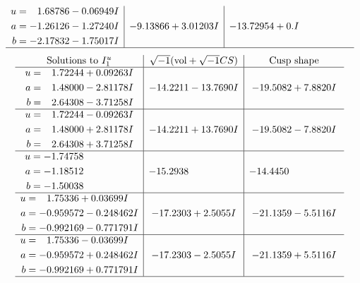 \documentclass[1p]{elsarticle_modified}
\theoremstyle{definition}
\newcommand{\I}{\sqrt{-1}}
\begin{document}
$$\begin{array}{c|c|c}
\begin{aligned}
u &= \phantom{-}1.68786 - 0.06949 I \\
a &= -1.26126 - 1.27240 I \\
b &= -2.17832 - 1.75017 I\end{aligned}
 & -9.13866 + 3.01203 I & -13.72954 + 0. I\phantom{ +0.000000I}\\
 \hline 
 \end{array}$$\newpage$$\begin{array}{c|c|c}  
\text{Solutions to }I^u_{1}& \I (\text{vol} + \sqrt{-1}CS) & \text{Cusp shape}\\
 \hline 
\begin{aligned}
u &= \phantom{-}1.72244 + 0.09263 I \\
a &= \phantom{-}1.48000 - 2.81178 I \\
b &= \phantom{-}2.64308 - 3.71258 I\end{aligned}
 & -14.2211 - 13.7690 I & -19.5082 + 7.8820 I \\ \hline\begin{aligned}
u &= \phantom{-}1.72244 - 0.09263 I \\
a &= \phantom{-}1.48000 + 2.81178 I \\
b &= \phantom{-}2.64308 + 3.71258 I\end{aligned}
 & -14.2211 + 13.7690 I & -19.5082 - 7.8820 I \\ \hline\begin{aligned}
u &= -1.74758\phantom{ +0.000000I} \\
a &= -1.18512\phantom{ +0.000000I} \\
b &= -1.50038\phantom{ +0.000000I}\end{aligned}
 & -15.2938\phantom{ +0.000000I} & -14.4450\phantom{ +0.000000I} \\ \hline\begin{aligned}
u &= \phantom{-}1.75336 + 0.03699 I \\
a &= -0.959572 - 0.248462 I \\
b &= -0.992169 - 0.771791 I\end{aligned}
 & -17.2303 + 2.5055 I & -21.1359 - 5.5116 I \\ \hline\begin{aligned}
u &= \phantom{-}1.75336 - 0.03699 I \\
a &= -0.959572 + 0.248462 I \\
b &= -0.992169 + 0.771791 I\end{aligned}
 & -17.2303 - 2.5055 I & -21.1359 + 5.5116 I\\
 \hline 
 \end{array}$$\newpage\newpage\renewcommand{\arraystretch}{1}
\end{document}
